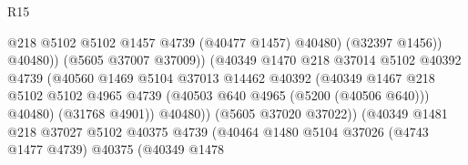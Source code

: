 \begin{lexlean}{R15}
\begin{coremodule}
{{{{{{{{{{{                                                  @218
                                                  @5102
                                                  @5102
                                                  @1457
                                                  @4739
                                                  (@40477 @1457)
                                                  @40480)
                                                (@32397 @1456))
                                              @40480))
                                          (@5605 @37007 @37009))
                                        (@40349
                                          @1470
                                          @218
                                          @37014
                                          @5102
                                          @40392
                                          @4739
                                          (@40560
                                            @1469
                                            @5104
                                            @37013
                                            @14462
                                            @40392
                                            (@40349
                                              @1467
                                              @218
                                              @5102
                                              @5102
                                              @4965
                                              @4739
                                              (@40503 @640 @4965 (@5200 (@40506 @640)))
                                              @40480)
                                            (@31768 @4901))
                                          @40480))
                                      (@5605 @37020 @37022))
                                    (@40349
                                      @1481
                                      @218
                                      @37027
                                      @5102
                                      @40375
                                      @4739
                                      (@40464
                                        @1480
                                        @5104
                                        @37026
                                        (@4743 @1477 @4739)
                                        @40375
                                        (@40349
                                          @1478
}}}}}}}}}}}
\end{coremodule}
\end{lexlean}
